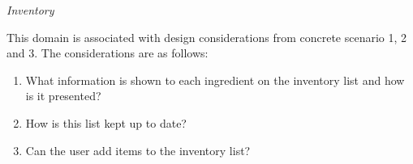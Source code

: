 \emph{Inventory}

This domain is associated with design considerations from concrete scenario 1, 2 and 3. The considerations are as follows:

\begin{enumerate}
	\item What information is shown to each ingredient on the inventory list and how is it presented? 
	\item How is this list kept up to date?
	\item Can the user add items to the inventory list?
\end{enumerate}
